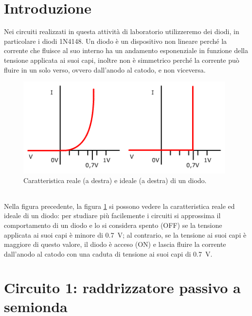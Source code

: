 \documentclass{report}
\begin{document}
\section*{Introduzione}
Nei circuiti realizzati in questa attività di laboratorio utilizzeremo dei diodi, in particolare i diodi 1N4148. Un diodo è un dispositivo non lineare perché la corrente che fluisce al suo interno ha un andamento esponenziale in funzione della tensione applicata ai suoi capi, inoltre non è simmetrico perché la corrente può fluire in un solo verso, ovvero dall'anodo al catodo, e non viceversa.
\begin{figure}[h]
	\centering
	\includegraphics[height=5cm]{immagini/diodo}
	\caption{Caratteristica reale (a destra) e ideale (a destra) di un diodo.}
	\label{figura:diodo}
\end{figure}
\\Nella figura precedente, la figura \ref{figura:diodo} si possono vedere la caratteristica reale ed ideale di un diodo: per studiare più facilemente i circuiti si approssima il comportamento di un diodo e lo si considera spento (OFF) se la tensione applicata ai suoi capi è minore di \SI{0.7}{\volt}; al contrario, se la tensione ai suoi capi è maggiore di questo valore, il diodo è acceso (ON) e lascia fluire la corrente dall'anodo al catodo con una caduta di tensione ai suoi capi di \SI{0.7}{\volt}.
\newpage
\section{Circuito 1: raddrizzatore passivo a semionda}
\end{document}
